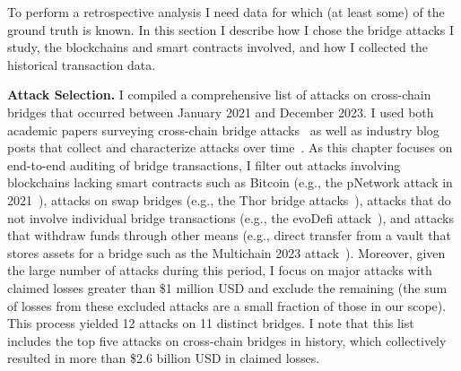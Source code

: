 
To perform a retrospective analysis I need data for which (at
least some) of the ground truth is known.   In this section I
describe how I chose the bridge attacks I study, the blockchains and
smart contracts involved, and how I collected the historical
transaction data.

\textbf{Attack Selection.}
%
I compiled a comprehensive list of attacks on cross-chain
bridges that occurred between January 2021 and December 2023.  I used both academic papers surveying cross-chain
bridge attacks~\cite{lee2023sok, zhang2023sok, zhao2023comprehensive} as well
as industry blog posts that collect and characterize attacks over time~\cite{GithubBridgeBugTracker, SlowMistHackedBridges:online,
  REKTDB:online, Web3Great:online, GithubBridgeHacks2:online}. 
As this chapter focuses on end-to-end auditing of bridge transactions, I filter out attacks
involving blockchains lacking smart contracts such
as Bitcoin (e.g., the pNetwork attack in 2021~\cite{pNetworkhack:online}), attacks on swap bridges (e.g., the Thor bridge attacks~\cite{Thorhack1:online,Thorhack2:online}), attacks that do not involve individual bridge transactions (e.g., the evoDefi attack~\cite{evoDefihack:online}),
and attacks that withdraw funds through other means (e.g., direct transfer from a vault that stores assets for a bridge such as the Multichain 2023 attack~\cite{Multichainhack:online}).  Moreover, given the large number of attacks during this period, I focus on
major attacks with claimed losses greater than \$1 million USD and
exclude the remaining (the sum of losses from these excluded attacks are a small fraction of those in our scope).
%
%
This process yielded 12 attacks on 11 distinct bridges.
I note that this list
includes the top five attacks on cross-chain bridges in history, which
collectively resulted in more than \$2.6 billion USD in claimed losses.

